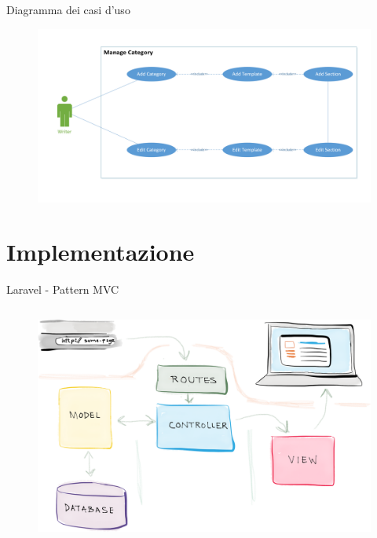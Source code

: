 \documentclass{beamer}
\begin{document}
\begin{frame}{Diagramma dei casi d'uso}
	\begin{figure}[!h]
		\includegraphics[scale=0.4]{uml_manageCategory.png}
	\end{figure}
\end{frame}


\section{Implementazione}
\begin{frame}{Laravel - Pattern MVC}
\begin{columns}
	\begin{figure}[!h]
		\includegraphics[scale=0.1]{mvc_diagram.png}
	\end{figure}
\end{columns}
\end{frame}

\end{document}
